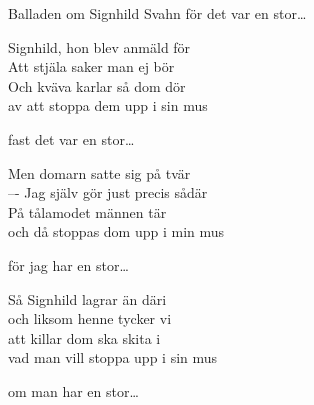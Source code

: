 \begin{song}{Balladen om Signhild Svahn}
	\vspace{-.1cm}
	för det var en stor\ldots{}
	
	\showversenumber
	Signhild, hon blev anmäld för\\
	Att stjäla saker man ej bör\\
	Och kväva karlar så dom dör\\
	av att stoppa dem upp i sin mus
	
	\vspace{-.1cm}
	fast det var en stor\ldots{}
	
	\showversenumber
	Men domarn satte sig på tvär\\
	–- Jag själv gör just precis sådär\\
	På tålamodet männen tär\\
	och då stoppas dom upp i min mus
	
	\vspace{-.1cm}
	för jag har en stor\ldots{}

	\showversenumber
	Så Signhild lagrar än däri\\
	och liksom henne tycker vi\\
	att killar dom ska skita i\\
	vad man vill stoppa upp i sin mus
	
	\vspace{-.1cm}
	om man har en stor\ldots{}
	
\end{song}
